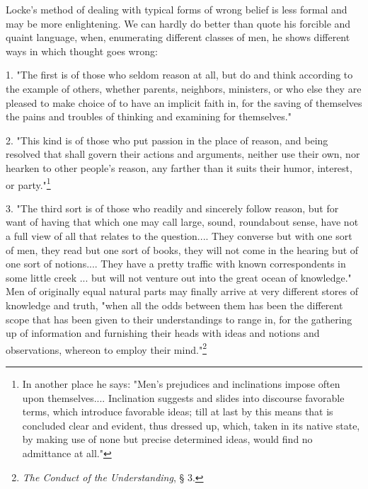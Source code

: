 \documentclass[letterpaper]{book}
\begin{document}

Locke's method of dealing with typical forms of wrong belief is less
formal and may be more enlightening. We can hardly do better than quote
his forcible and quaint language, when, enumerating different classes of
men, he shows different ways in which thought goes
wrong:


1. "The first is of those who seldom reason at all, but do and think
according to the example of others, whether parents, neighbors,
ministers, or who else they are pleased to make choice of to have an
implicit faith in, for the saving of themselves the pains and troubles
of thinking and examining for themselves."


2. "This kind is of those who put passion in the place of reason, and
being resolved that shall govern their actions and arguments, neither
use their own, nor hearken to other people's reason, any farther than it
suits their humor, interest, or
party."\footnote{In another place he says: "Men's prejudices and inclinations impose
often upon themselves.... Inclination suggests and slides into discourse
favorable terms, which introduce favorable ideas; till at last by this
means that is concluded clear and evident, thus dressed up, which, taken
in its native state, by making use of none but precise determined ideas,
would find no admittance at all."
}


3. "The third sort is of those who readily and sincerely follow reason,
but for want of having that which one may call large, sound, roundabout
sense, have not a full view of all that relates to the question.... They
converse but with one sort of men, they read but one sort of books, they
will not come in the hearing but of one sort of notions.... They have a
pretty traffic with known correspondents in some little creek ... but
will not venture out into the great ocean of knowledge." Men of
originally equal natural parts may finally arrive at very different
stores of knowledge and truth, "when all the odds between them has been
the different scope that has been given to their understandings to range
in, for the gathering up of information and furnishing their heads with
ideas and notions and observations, whereon to employ their
mind."\footnote{\emph{The Conduct of the Understanding}, § 3.}
\end{document}
